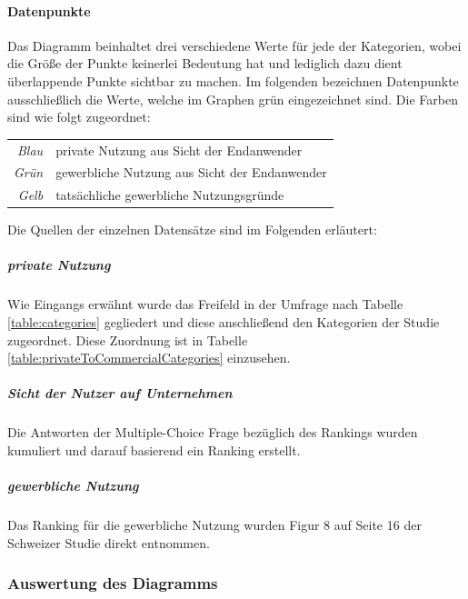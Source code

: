 \documentclass[a4paper]{article}
\begin{document}
                \paragraph{Datenpunkte}
                    Das Diagramm beinhaltet drei verschiedene Werte für jede der Kategorien, wobei die Größe der Punkte keinerlei Bedeutung hat und lediglich dazu dient überlappende Punkte sichtbar zu machen. Im folgenden bezeichnen Datenpunkte ausschließlich die Werte, welche im Graphen grün eingezeichnet sind. Die Farben sind wie folgt zugeordnet:\\
                    \begin{table}[H]
                        \centering
                        \bgroup
                        \def\arraystretch{1.5}
                        \begin{tabular}{ r | l }
                            \emph{Blau} & private Nutzung aus Sicht der Endanwender\\
                            \emph{Grün} & gewerbliche Nutzung aus Sicht der Endanwender\\
                            \emph{Gelb} & tatsächliche gewerbliche Nutzungsgründe
                        \end{tabular}
                        \egroup
                    \end{table}
                    
                    Die Quellen der einzelnen Datensätze sind im Folgenden erläutert:
                    \subparagraph{private Nutzung} Wie Eingangs erwähnt wurde das Freifeld in der Umfrage nach Tabelle \ref{table:categories} gegliedert und diese anschließend den Kategorien der Studie zugeordnet. Diese Zuordnung ist in Tabelle \ref{table:privateToCommercialCategories} einzusehen.
                    
                    \subparagraph{Sicht der Nutzer auf Unternehmen} Die Antworten der Multiple-Choice Frage bezüglich des Rankings wurden kumuliert und darauf basierend ein Ranking erstellt.
                    
                    \subparagraph{gewerbliche Nutzung} Das Ranking für die gewerbliche Nutzung wurden Figur 8 auf Seite 16 der Schweizer Studie\cite{oss:studie} direkt entnommen.
            
            \subsubsection{Auswertung des Diagramms}
\end{document}
